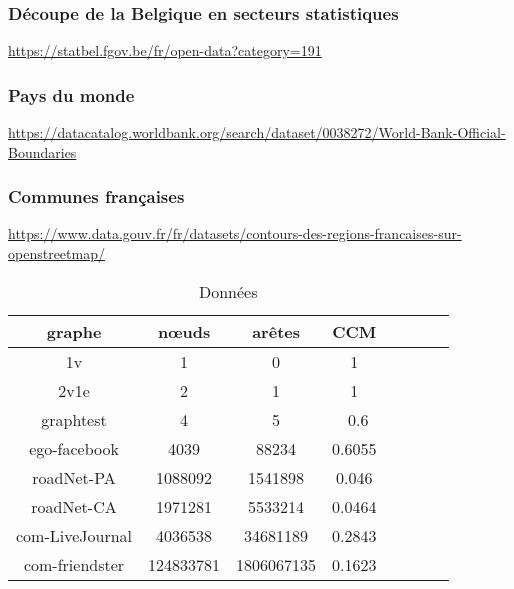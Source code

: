     \subsubsection{Découpe de la Belgique en secteurs statistiques}
    \href{https://statbel.fgov.be/fr/open-data?category=191}{https://statbel.fgov.be/fr/open-data?category=191}
    \subsubsection{Pays du monde}
    \href{https://datacatalog.worldbank.org/search/dataset/0038272/World-Bank-Official-Boundaries}{https://datacatalog.worldbank.org/search/dataset/0038272/World-Bank-Official-Boundaries}
    \subsubsection{Communes françaises}
    \href{https://www.data.gouv.fr/fr/datasets/contours-des-regions-francaises-sur-openstreetmap/}{https://www.data.gouv.fr/fr/datasets/contours-des-regions-francaises-sur-openstreetmap/}
    \begin{table}
        \centering

        \begin{tabular}{|c|c|c|c
        |c|c|c|c}
            \hline
            graphe & nœuds & arêtes & CCM  \\
            \hline
            1v & 1 & 0 & 1\\
            2v1e & 2 & 1 & 1\\
            graphtest & 4 & 5 & ~0.6 \\
            ego-facebook & 4039 & 88234 & 0.6055\\
            roadNet-PA & 1088092 & 1541898 & 0.046\\
            roadNet-CA & 1971281 & 5533214 & 0.0464\\
            com-LiveJournal & 4036538 & 34681189 & 0.2843\\
            com-friendster & 124833781 & 1806067135 & 0.1623\\
            \hline
        \end{tabular}
        \caption{\label{tab:table}Données}
    \end{table}




